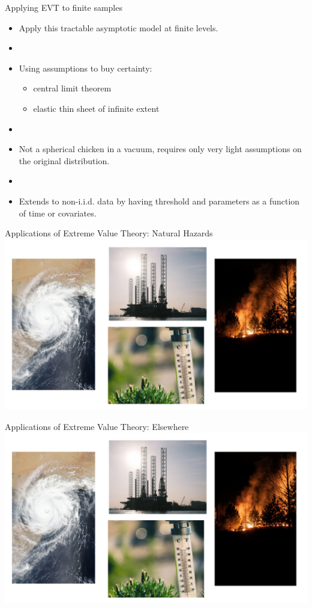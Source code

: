 \begin{frame}{Applying EVT to finite samples}
\begin{itemize}
    \item Apply this tractable asymptotic model at finite levels. 
    \item []
    \item Using assumptions to buy certainty:
    \begin{itemize}
        \item central limit theorem 
        \item elastic thin sheet of infinite extent
    \end{itemize} 
    \item []
    \item Not a spherical chicken in a vacuum, requires only very light assumptions on the original distribution. 
    \item []
    \item Extends to non-i.i.d. data by having threshold and parameters as a function of time or covariates.

\end{itemize}
\end{frame}

\begin{frame}{Applications of Extreme Value Theory: Natural Hazards}
\includegraphics[page=1, width=\textwidth]{extremes_applications.pdf}
\end{frame}

\begin{frame}{Applications of Extreme Value Theory: Elsewhere}
\includegraphics[page=2, width=\textwidth]{extremes_applications.pdf}
\end{frame}



